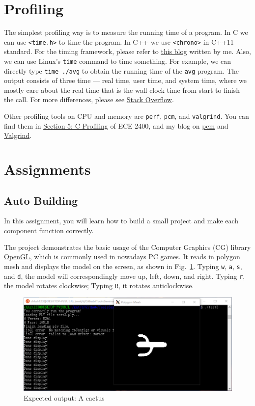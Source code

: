\documentclass[english]{../TexTemplate/thesis}
\begin{document}
\section{Profiling}
The simplest profiling way is to measure the running time of a program.
In C we can use \verb'<time.h>' to time the program.
In C++ we use \verb'<chrono>' in C++11 standard.
For the timing framework, please refer to \href{https://chhzh123.github.io/2019-03-31-c-timing/}{this blog} written by me.
Also, we can use Linux's \verb'time' command to time something.
For example, we can directly type \verb'time ./avg' to obtain the running time of the \verb'avg' program.
The output consists of three time --- real time, user time, and system time, where we mostly care about the real time that is the wall clock time from start to finish the call.
For more differences, please see \href{https://stackoverflow.com/questions/556405/what-do-real-user-and-sys-mean-in-the-output-of-time1}{Stack Overflow}.

Other profiling tools on CPU and memory are \verb'perf', \verb'pcm', and \verb'valgrind'.
You can find them in \href{https://cornell-ece2400.github.io/ece2400-docs/ece2400-sec5-c-profiling/}{Section 5: C Profiling} of ECE 2400, and my blog on \href{https://chhzh123.github.io/2019-02-19-pcm/}{pcm} and \href{https://chhzh123.github.io/2019-02-27-spa-extra-1/}{Valgrind}.

\newpage
\section{Assignments}
\subsection{Auto Building}
In this assignment, you will learn how to build a small project and make each component function correctly.

The project demonstrates the basic usage of the Computer Graphics (CG) library \href{https://www.opengl.org}{OpenGL}, which is commonly used in nowadays PC games.
It reads in polygon mesh and displays the model on the screen, as shown in Fig.~\ref{fig:cactus}.
Typing \verb'w', \verb'a', \verb's', and \verb'd', the model will correspondingly move up, left, down, and right.
Typing \verb'r', the model rotates clockwise; Typing \verb'R', it rotates anticlockwise.
\begin{figure}[H]
\centering
\includegraphics[width=\linewidth]{fig/assignments/autobuild_result.png}
\caption{Expected output: A cactus}
\label{fig:cactus}
\end{figure}
\end{document}
